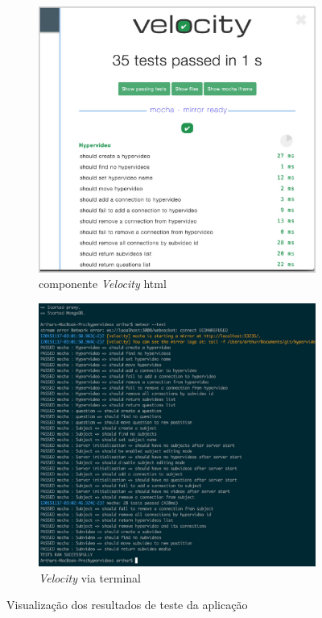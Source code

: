 \begin{figure}[h!]
	\centering
	\begin{subfigure}{.5\textwidth}
  		\centering
  		\includegraphics[width=.95\linewidth]{figuras/teste_a.eps}
  		\caption{componente \textit{Velocity} html}
  		\label{fig:teste_a}
	\end{subfigure}%
	\begin{subfigure}{.5\textwidth}
  		\centering
  		\includegraphics[width=.95\linewidth]{figuras/teste_b.eps}
  		\caption{\textit{Velocity} via terminal}
  		\label{fig:teste_b}
	\end{subfigure}
	\caption{Visualização dos resultados de teste da aplicação}
	\label{fig:testes}
\end{figure}

